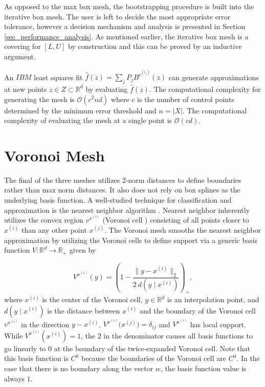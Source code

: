 As opposed to the max box mesh, the bootstrapping procedure is built into the iterative box mesh. The user is left to decide the most appropriate error tolerance, however a decision mechanism and analysis is presented in Section \ref{sec_performance_analysis}. As mentioned earlier, the iterative box mesh is a covering for $[L,U]$ by construction and this can be proved by an inductive argument.

An $IBM$ least squares fit $\hat f(z) = \sum_{j}P_j B^{c^{(i_j)}}(z)$ can generate approximations at new points $z \in Z \subset \mathbb{R}^d$ by evaluating $\hat f(z)$. The computational complexity for generating the mesh is $\mathcal{O}(c^2 n d)$ where $c$ is the number of control points determined by the minimum error threshold and $n = |X|$. The computational complexity of evaluating the mesh at a single point is $\mathcal{O}(c d)$.

\section{Voronoi Mesh}

The final of the three meshes utilizes 2-norm distances to define boundaries rather than max norm distances. It also does not rely on box splines as the underlying basis function. A well-studied technique for classification and approximation is the nearest neighbor algorithm \cite{cover1967nearest}. Nearest neighbor inherently utilizes the convex region $v^{x^{(i)}}$ (Voronoi cell \cite{dirichlet1850reduction}) consisting of all points closer to $x^{(i)}$ than any other point $x^{(j)}$. The Voronoi mesh smooths the nearest neighbor approximation by utilizing the Voronoi cells to define support via a generic basis function $V: \mathbb{R}^d \rightarrow \mathbb{R}_+$ given by

$$ V^{x^{(i)}}(y) = \left(1 - \frac{\bigl\|y - x^{(i)}\bigr\|_2}{2 \ d(y \mid x^{(i)})} \right)_+, $$
where $x^{(i)}$ is the center of the Voronoi cell, $y \in \mathbb{R}^d$ is an interpolation point, and $d(y \mid x^{(i)})$ is the distance between $x^{(i)}$ and the boundary of the Voronoi cell $v^{x^{(i)}}$ in the direction $y - x^{(i)}$. $V^{x^{(i)}}\bigl(x^{(j)}\bigr) = \delta_{ij}$ and $V^{x^{(i)}}$ has local support. While $V^{x^{(i)}}(x^{(i)}) = 1$, the $2$ in the denominator causes all basis functions to go linearly to $0$ at the boundary of the twice-expanded Voronoi cell. Note that this basis function is $C^0$ because the boundaries of the Voronoi cell are $C^0$. In the case that there is no boundary along the vector $w$, the basis function value is always $1$.

